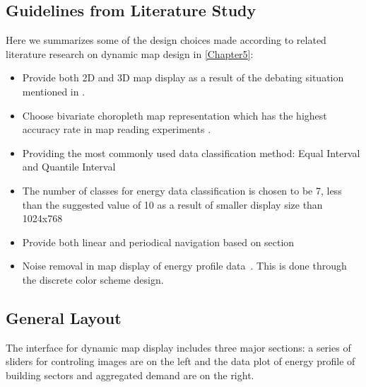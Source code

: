 \subsection{Guidelines from Literature Study}
Here we summarizes some of the design choices made according to
related literature research on dynamic map design in \cref{Chapter5}:
\begin{itemize}
\item Provide both 2D and 3D map display as a result of the debating
  situation mentioned in .
\item Choose bivariate choropleth map representation which has the
  highest accuracy rate in map reading experiments .
\item Providing the most commonly used data classification method:
  Equal Interval and Quantile Interval 
\item The number of classes for energy data classification is chosen
  to be 7, less than the suggested value of 10 as a result of smaller
  display size than 1024x768 
\item Provide both linear and periodical navigation based on section
\item Noise removal in map display of energy profile
  data~\cite{Dorling1992}. This is done through the discrete color
  scheme design.
\end{itemize}

\subsection {General Layout}
The interface for dynamic map display includes three major sections: a
series of sliders for controling images are on the left and the data
plot of energy profile of building sectors and aggregated demand are
on the right.

